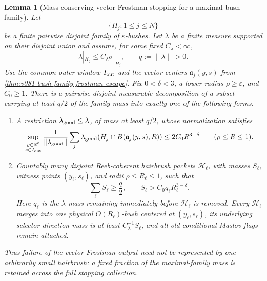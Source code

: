 \documentclass[10pt]{article}
\newtheorem{lemma}[theorem]{Lemma}
\begin{document}
\begin{lemma}[Mass-conserving vector-Frostman stopping for a maximal bush family]
\label{lem:v081-mass-conserving-vector-frostman-stopping}
Let
\[
\{H_j:1\le j\le N\}
\]
be a finite pairwise disjoint family of \(\varepsilon\)-bushes.  Let \(\lambda\) be a finite measure
supported on their disjoint union and assume, for some fixed \(C_\lambda<\infty\),
\[
\lambda|_{H_j}\le C_\lambda\sigma|_{H_j},
\qquad
q:=\|\lambda\|>0.
\]
Use the common outer window \(I_{\rm out}\) and the vector centers
\(\mathfrak a_j(y,s)\) from
\cref{thm:v081-bush-family-frostman-escape}.  Fix \(0<\delta<3\), a lower radius
\(\rho\ge\varepsilon\), and \(C_0\ge1\).  There is a pairwise disjoint measurable decomposition of
a subset carrying at least \(q/2\) of the family mass into exactly one of the following forms.
\begin{enumerate}[label=\textnormal{(\roman*)}]
\item A restriction \(\lambda_{\rm good}\le\lambda\), of mass at least \(q/2\), whose normalization
satisfies
\[
\sup_{\substack{y\in\mathbb R^3\\s\in I_{\rm out}}}
\frac1{\|\lambda_{\rm good}\|}
\sum_j
\lambda_{\rm good}\!\left(
H_j\cap B(\mathfrak a_j(y,s),R)
\right)
\le
2C_0R^{3-\delta}
\qquad(\rho\le R\le1).
\]
\item Countably many disjoint Reeb-coherent hairbrush packets
\(\mathcal H_\ell\), with masses \(S_\ell\), witness points
\((y_\ell,s_\ell)\), and radii \(\rho\le R_\ell\le1\), such that
\begin{equation}
\label{eq:v081-mass-conserving-hairbrush-total}
\boxed{
\sum_\ell S_\ell\ge\frac q2,
\qquad
S_\ell
>
C_0q_\ell R_\ell^{3-\delta}.
}
\end{equation}
Here \(q_\ell\) is the \(\lambda\)-mass remaining immediately before \(\mathcal H_\ell\) is removed.
Every \(\mathcal H_\ell\) merges into one physical \(O(R_\ell)\)-bush centered at
\((y_\ell,s_\ell)\), its underlying selector-direction mass is at least
\(C_\lambda^{-1}S_\ell\), and all old conditional Maslov flags remain attached.
\end{enumerate}
Thus failure of the vector-Frostman output need not be represented by one arbitrarily small
hairbrush: a fixed fraction of the maximal-family mass is retained across the full stopping
collection.
\end{lemma}
\end{document}

